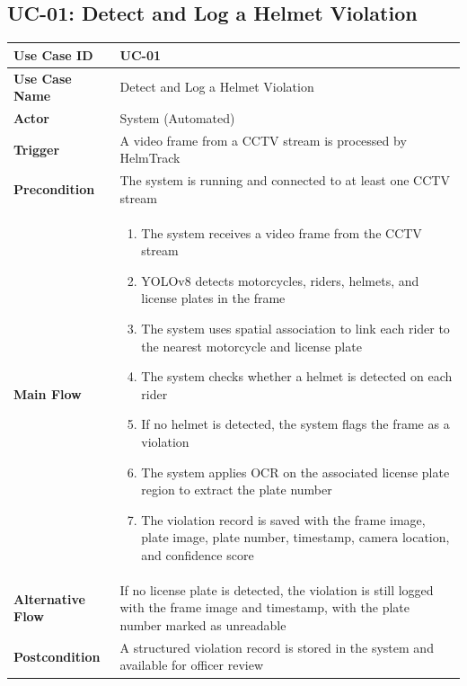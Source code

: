 \subsection{UC-01: Detect and Log a Helmet Violation}
\begin{subsecbody}
\centering
\begin{tabularx}{\textwidth}{|p{3.5cm}|X|}
\hline
\textbf{Use Case ID} & UC-01 \\
\hline
\textbf{Use Case Name} & Detect and Log a Helmet Violation \\
\hline
\textbf{Actor} & System (Automated) \\
\hline
\textbf{Trigger} & A video frame from a CCTV stream is processed by HelmTrack \\
\hline
\textbf{Precondition} & The system is running and connected to at least one CCTV stream \\
\hline
\textbf{Main Flow} &
\begin{enumerate}[leftmargin=20pt, topsep=0pt, itemsep=0pt]
    \item The system receives a video frame from the CCTV stream
    \item YOLOv8 detects motorcycles, riders, helmets, and license plates in the frame
    \item The system uses spatial association to link each rider to the nearest motorcycle and license plate
    \item The system checks whether a helmet is detected on each rider
    \item If no helmet is detected, the system flags the frame as a violation
    \item The system applies OCR on the associated license plate region to extract the plate number
    \item The violation record is saved with the frame image, plate image, plate number, timestamp, camera location, and confidence score
\end{enumerate} \\
\hline
\textbf{Alternative Flow} & If no license plate is detected, the violation is still logged with the frame image and timestamp, with the plate number marked as unreadable \\
\hline
\textbf{Postcondition} & A structured violation record is stored in the system and available for officer review \\
\hline
\end{tabularx}
\end{subsecbody}


